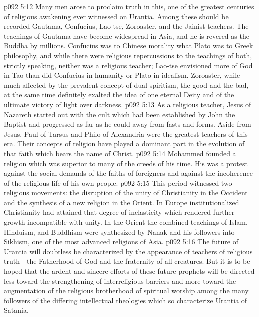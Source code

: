 \pc \vs p092 5:12 \bibnobreakspace {} Many men arose to proclaim truth in this, one of the greatest centuries of religious awakening ever witnessed on Urantia. Among these should be recorded Gautama, Confucius, Lao\hyp{}tse, Zoroaster, and the Jainist teachers. The teachings of Gautama have become widespread in Asia, and he is revered as the Buddha by millions. Confucius was to Chinese morality what Plato was to Greek philosophy, and while there were religious repercussions to the teachings of both, strictly speaking, neither was a religious teacher; Lao\hyp{}tse envisioned more of God in Tao than did Confucius in humanity or Plato in idealism. Zoroaster, while much affected by the prevalent concept of dual spiritism, the good and the bad, at the same time definitely exalted the idea of one eternal Deity and of the ultimate victory of light over darkness.
\pc \vs p092 5:13 \bibnobreakspace {} As a religious teacher, Jesus of Nazareth started out with the cult which had been established by John the Baptist and progressed as far as he could away from fasts and forms. Aside from Jesus, Paul of Tarsus and Philo of Alexandria were the greatest teachers of this era. Their concepts of religion have played a dominant part in the evolution of that faith which bears the name of Christ.
\pc \vs p092 5:14 \bibnobreakspace {} Mohammed founded a religion which was superior to many of the creeds of his time. His was a protest against the social demands of the faiths of foreigners and against the incoherence of the religious life of his own people.\plusone
\pc \vs p092 5:15 \bibnobreakspace {} This period witnessed two religious movements: the disruption of the unity of Christianity in the Occident and the synthesis of a new religion in the Orient. In Europe institutionalized Christianity had attained that degree of inelasticity which rendered further growth incompatible with unity. In the Orient the combined teachings of Islam, Hinduism, and Buddhism were synthesized by Nanak and his followers into Sikhism, one of the most advanced religions of Asia.\plusone
\pc \vs p092 5:16 The future of Urantia will doubtless be characterized by the appearance of teachers of religious truth---the Fatherhood of God and the fraternity of all creatures. But it is to be hoped that the ardent and sincere efforts of these future prophets will be directed less toward the strengthening of interreligious barriers and more toward the augmentation of the religious brotherhood of spiritual worship among the many followers of the differing intellectual theologies which so characterize Urantia of Satania.

